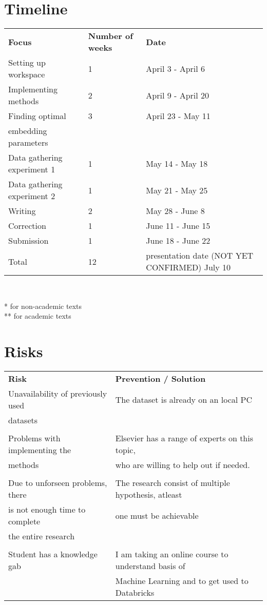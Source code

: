 \documentclass[10pt,a4paper]{article}
\begin{document}
\section{Timeline}
\begin{center}
\begin{tabular}{lll}
\textbf{Focus} & \textbf{Number of weeks} & \textbf{Date} \\
Setting up workspace & 1 & April 3 - April 6\\
Implementing methods & 2 & April 9 - April 20\\
Finding optimal & 3 & April 23 - May 11\\
embedding parameters & & \\
Data gathering experiment 1 & 1 & May 14 - May 18\\
Data gathering experiment 2 & 1 & May 21 - May 25\\
Writing & 2 & May 28 - June 8\\
Correction & 1 & June 11 - June 15\\
Submission & 1 & June 18 - June 22\\
Total & 12 & presentation date (NOT YET CONFIRMED) July 10\\
\end{tabular}\\
\end{center}
*  for non-academic texts\\ ** for academic texts

\section{Risks}
\begin{tabular}{ll}
\textbf{Risk} & \textbf{Prevention / Solution}\\
Unavailability of previously used & The dataset is already on an local PC\\datasets&\\&\\
Problems with implementing the& Elsevier has a range of experts on this topic,
\\methods&who are willing to help out if needed.\\&\\
Due to unforseen problems, there &The research consist of multiple hypothesis, atleast \\is not enough time to complete & one must be achievable\\the entire research &\\&\\
Student has a knowledge gab & I am taking an online course to understand basis of \\
 &Machine Learning and to get used to Databricks\\
\end{tabular}\\
\newpage
\end{document}
